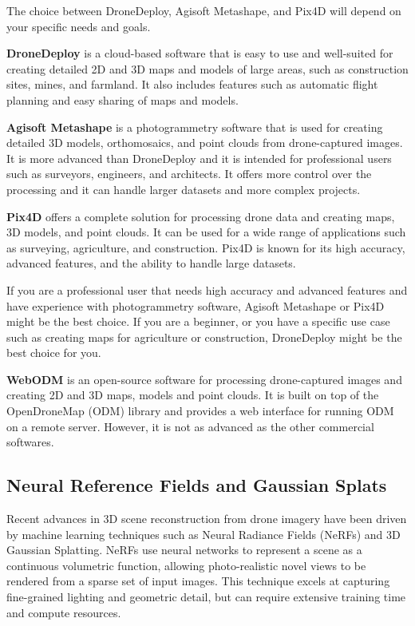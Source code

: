 \documentclass[
  12pt,
]{book}
\begin{document}
The choice between DroneDeploy, Agisoft Metashape, and Pix4D will depend on your specific needs and goals.

\textbf{DroneDeploy} is a cloud-based software that is easy to use and well-suited for creating detailed 2D and 3D maps and models of large areas, such as construction sites, mines, and farmland. It also includes features such as automatic flight planning and easy sharing of maps and models.

\textbf{Agisoft Metashape} is a photogrammetry software that is used for creating detailed 3D models, orthomosaics, and point clouds from drone-captured images. It is more advanced than DroneDeploy and it is intended for professional users such as surveyors, engineers, and architects. It offers more control over the processing and it can handle larger datasets and more complex projects.

\textbf{Pix4D} offers a complete solution for processing drone data and creating maps, 3D models, and point clouds. It can be used for a wide range of applications such as surveying, agriculture, and construction. Pix4D is known for its high accuracy, advanced features, and the ability to handle large datasets.

If you are a professional user that needs high accuracy and advanced features and have experience with photogrammetry software, Agisoft Metashape or Pix4D might be the best choice. If you are a beginner, or you have a specific use case such as creating maps for agriculture or construction, DroneDeploy might be the best choice for you.

\textbf{WebODM} is an open-source software for processing drone-captured images and creating 2D and 3D maps, models and point clouds. It is built on top of the OpenDroneMap (ODM) library and provides a web interface for running ODM on a remote server. However, it is not as advanced as the other commercial softwares.

\subsection{Neural Reference Fields and Gaussian Splats}\label{neural-reference-fields-and-gaussian-splats}

Recent advances in 3D scene reconstruction from drone imagery have been driven by machine learning techniques such as Neural Radiance Fields (NeRFs) and 3D Gaussian Splatting. NeRFs use neural networks to represent a scene as a continuous volumetric function, allowing photo-realistic novel views to be rendered from a sparse set of input images. This technique excels at capturing fine-grained lighting and geometric detail, but can require extensive training time and compute resources.
\end{document}
